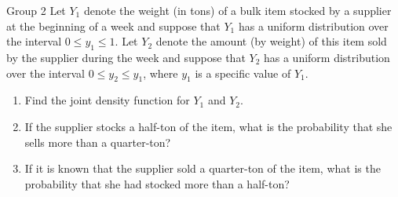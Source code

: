 \documentclass{article}
\theoremstyle{plain}
\theoremstyle{definition}
\theoremstyle{remark}
\begin{document}
\begin{problem}
    {Group 2}
    Let $Y_1$ denote the weight (in tons) of a bulk item stocked by a supplier at the beginning of a week and suppose that $Y_1$ has a uniform distribution over the interval $0 \leq y_1 \leq 1$. Let $Y_2$ denote the amount (by weight) of this item sold by the supplier during the week and suppose that $Y_2$ has a uniform distribution over the interval $0 \leq y_2 \leq y_1$, where $y_1$ is a specific value of $Y_1$.
    \begin{enumerate}
        \item Find the joint density function for $Y_1$ and $Y_2$.
        \item If the supplier stocks a half-ton of the item, what is the probability that she sells more than a quarter-ton?
        \item If it is known that the supplier sold a quarter-ton of the item, what is the probability that she had stocked more than a half-ton?
    \end{enumerate}
\end{problem}
\end{document}

